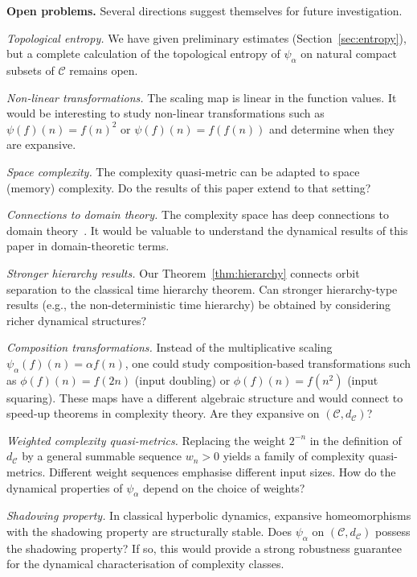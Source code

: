 \documentclass[11pt,a4paper]{article}
\theoremstyle{plain}
\theoremstyle{definition}
\newcommand{\C}{\mathcal{C}}
\begin{document}
\textbf{Open problems.}
Several directions suggest themselves for future investigation.

\emph{Topological entropy.}  We have given preliminary estimates
(Section~\ref{sec:entropy}), but a complete calculation of the
topological entropy of $\psi_\alpha$ on natural compact subsets of
$\C$ remains open.

\emph{Non-linear transformations.}  The scaling map is linear in
the function values.  It would be interesting to study non-linear
transformations such as $\psi(f)(n)=f(n)^2$ or $\psi(f)(n)=f(f(n))$
and determine when they are expansive.

\emph{Space complexity.}  The complexity quasi-metric can be adapted
to space (memory) complexity.  Do the results of this paper extend
to that setting?

\emph{Connections to domain theory.}  The complexity space has deep
connections to domain theory~\cite{abramsky1994,scott1982}.  It
would be valuable to understand the dynamical results of this paper
in domain-theoretic terms.

\emph{Stronger hierarchy results.}  Our
Theorem~\ref{thm:hierarchy} connects orbit separation to the
classical time hierarchy theorem.  Can stronger hierarchy-type
results (e.g., the non-deterministic time hierarchy) be obtained
by considering richer dynamical structures?

\emph{Composition transformations.}  Instead of the multiplicative
scaling $\psi_\alpha(f)(n)=\alpha f(n)$, one could study
composition-based transformations such as
$\phi(f)(n)=f(2n)$ (input doubling) or $\phi(f)(n)=f(n^2)$
(input squaring).  These maps have a different algebraic structure
and would connect to speed-up theorems in complexity theory.  Are
they expansive on $(\C,d_\C)$?

\emph{Weighted complexity quasi-metrics.}  Replacing the weight
$2^{-n}$ in the definition of $d_\C$ by a general summable
sequence $w_n>0$ yields a family of complexity quasi-metrics.
Different weight sequences emphasise different input sizes.
How do the dynamical properties of $\psi_\alpha$ depend on the
choice of weights?

\emph{Shadowing property.}  In classical hyperbolic dynamics,
expansive homeomorphisms with the shadowing property are
structurally stable.  Does $\psi_\alpha$ on $(\C,d_\C)$ possess
the shadowing property?  If so, this would provide a strong
robustness guarantee for the dynamical characterisation of
complexity classes.
\end{document}
